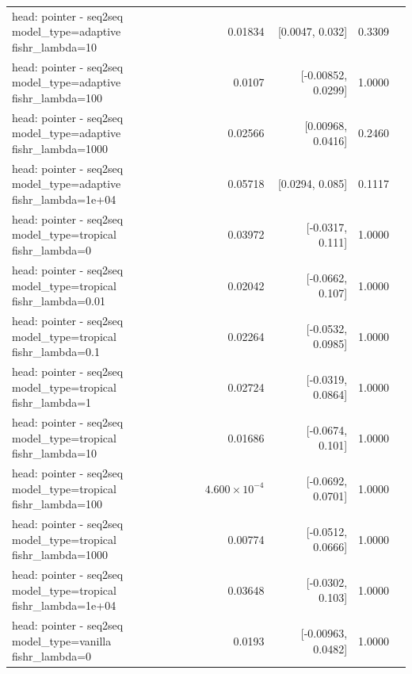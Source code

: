 \documentclass[10pt]{article}
\makeatletter
\newcommand{\stackcell}[1]{\begin{tabular}[t]{@{}l@{}}#1\end{tabular}}
\makeatother
\begin{document}
{\begin{longtable}{lrrrl}
\stackcell{head: pointer - seq2seq\\\footnotesize model\_type=adaptive fishr\_lambda=10 } & 0.01834 & [0.0047, 0.032] & 0.3309 & \\
\stackcell{head: pointer - seq2seq\\\footnotesize model\_type=adaptive fishr\_lambda=100 } & 0.0107 & [-0.00852, 0.0299] & 1.0000 & \\
\stackcell{head: pointer - seq2seq\\\footnotesize model\_type=adaptive fishr\_lambda=1000 } & 0.02566 & [0.00968, 0.0416] & 0.2460 & \\
\stackcell{head: pointer - seq2seq\\\footnotesize model\_type=adaptive fishr\_lambda=1e+04 } & 0.05718 & [0.0294, 0.085] & 0.1117 & \\
\stackcell{head: pointer - seq2seq\\\footnotesize model\_type=tropical fishr\_lambda=0 } & 0.03972 & [-0.0317, 0.111] & 1.0000 & \\
\stackcell{head: pointer - seq2seq\\\footnotesize model\_type=tropical fishr\_lambda=0.01 } & 0.02042 & [-0.0662, 0.107] & 1.0000 & \\
\stackcell{head: pointer - seq2seq\\\footnotesize model\_type=tropical fishr\_lambda=0.1 } & 0.02264 & [-0.0532, 0.0985] & 1.0000 & \\
\stackcell{head: pointer - seq2seq\\\footnotesize model\_type=tropical fishr\_lambda=1 } & 0.02724 & [-0.0319, 0.0864] & 1.0000 & \\
\stackcell{head: pointer - seq2seq\\\footnotesize model\_type=tropical fishr\_lambda=10 } & 0.01686 & [-0.0674, 0.101] & 1.0000 & \\
\stackcell{head: pointer - seq2seq\\\footnotesize model\_type=tropical fishr\_lambda=100 } & $4.600\times10^{-4}$ & [-0.0692, 0.0701] & 1.0000 & \\
\stackcell{head: pointer - seq2seq\\\footnotesize model\_type=tropical fishr\_lambda=1000 } & 0.00774 & [-0.0512, 0.0666] & 1.0000 & \\
\stackcell{head: pointer - seq2seq\\\footnotesize model\_type=tropical fishr\_lambda=1e+04 } & 0.03648 & [-0.0302, 0.103] & 1.0000 & \\
\stackcell{head: pointer - seq2seq\\\footnotesize model\_type=vanilla fishr\_lambda=0 } & 0.0193 & [-0.00963, 0.0482] & 1.0000 & \\

\end{longtable}}
\end{document}
